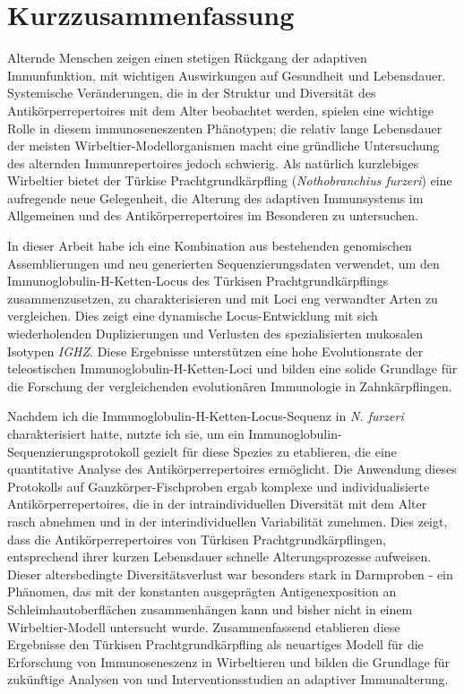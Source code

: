 {
\cleardoublepage
\setsinglecolumn
\chapter*{\centering \LARGE Kurzzusammenfassung}
\thispagestyle{empty}
Alternde Menschen zeigen einen stetigen R\"uckgang der adaptiven Immunfunktion, mit wichtigen Auswirkungen auf Gesundheit und Lebensdauer. Systemische Ver\"anderungen, die in der Struktur und Diversit\"at des Antik\"orperrepertoires mit dem Alter beobachtet werden, spielen eine wichtige Rolle in diesem immunoseneszenten Ph\"anotypen; die relativ lange Lebensdauer der meisten Wirbeltier-Modellorganismen macht eine gr\"undliche Untersuchung des alternden Immunrepertoires jedoch schwierig. Als nat\"urlich kurzlebiges Wirbeltier bietet der T\"urkise Prachtgrundk\"arpfling (\textit{Nothobranchius furzeri}) eine aufregende neue Gelegenheit, die Alterung des adaptiven Immunsystems im Allgemeinen und des Antik\"orperrepertoires im Besonderen zu untersuchen.

In dieser Arbeit habe ich eine Kombination aus bestehenden genomischen Assemblierungen und neu generierten Sequenzierungsdaten verwendet, um den Immunoglobulin-H-Ketten-Locus des T\"urkisen Prachtgrundk\"arpflings zusammenzusetzen, zu charakterisieren und mit Loci eng verwandter Arten zu vergleichen. Dies zeigt eine dynamische Locus-Entwicklung mit sich wiederholenden Duplizierungen und Verlusten des spezialisierten mukosalen Isotypen \textit{IGHZ}. Diese Ergebnisse unterst\"utzen eine hohe Evolutionsrate der teleostischen Immunoglobulin-H-Ketten-Loci und bilden eine solide Grundlage f\"ur die Forschung der vergleichenden evolution\"aren Immunologie in Zahnk\"arpflingen.

Nachdem ich die Immunoglobulin-H-Ketten-Locus-Sequenz in \textit{N. furzeri} charakterisiert hatte, nutzte ich sie, um ein Immunoglobulin-Sequenzierungsprotokoll gezielt f\"ur diese Spezies zu etablieren, die eine quantitative Analyse des Antik\"orperrepertoires erm\"oglicht. Die Anwendung dieses Protokolls auf Ganzk\"orper-Fischproben ergab komplexe und individualisierte Antik\"orperrepertoires, die in der intraindividuellen Diversit\"at mit dem Alter rasch abnehmen und in der interindividuellen Variabilit\"at zunehmen. Dies zeigt, dass die Antik\"orperrepertoires von T\"urkisen Prachtgrundk\"arpflingen, entsprechend ihrer kurzen Lebensdauer schnelle Alterungsprozesse aufweisen. Dieser altersbedingte Diversit\"atsverlust war besonders stark in Darmproben - ein Ph\"anomen, das mit der konstanten ausgepr\"agten Antigenexposition an Schleimhautoberfl\"achen zusammenh\"angen kann und bisher nicht in einem Wirbeltier-Modell untersucht wurde. Zusammenfassend etablieren diese Ergebnisse den T\"urkisen Prachtgrundk\"arpfling als neuartiges Modell f\"ur die Erforschung von Immunoseneszenz in Wirbeltieren und bilden die Grundlage f\"ur zuk\"unftige Analysen von und Interventionsstudien an adaptiver Immunalterung.
}
